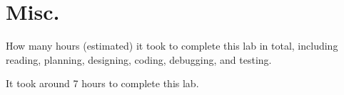 \documentclass{article}
\newenvironment{solution}{\begin{mdframed}[style=SolutionFrame]}{\end{mdframed}}
\begin{document}
\section{Misc.}
    How many hours (estimated) it took to complete this lab in total, including reading, planning, designing, coding, debugging, and testing.
    \begin{solution}
        It took around 7 hours to complete this lab.
    \end{solution}
\end{document}

